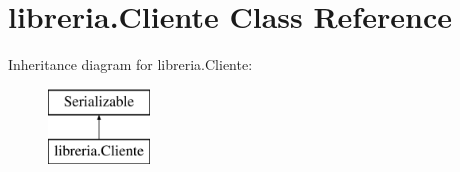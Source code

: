 \hypertarget{classlibreria_1_1_cliente}{}\section{libreria.\+Cliente Class Reference}
\label{classlibreria_1_1_cliente}
Inheritance diagram for libreria.\+Cliente\+:\begin{figure}[H]
\begin{center}
\leavevmode
\includegraphics[height=2.000000cm]{classlibreria_1_1_cliente}
\end{center}
\end{figure}
